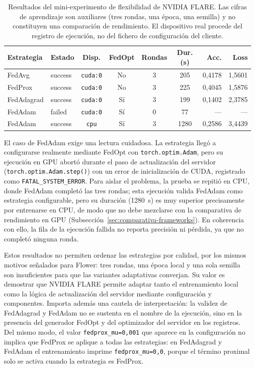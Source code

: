 \begin{table}[htbp]
  \centering
  \caption{Resultados del mini-experimento de flexibilidad de NVIDIA FLARE. Las
  cifras de aprendizaje son auxiliares (tres rondas, una época, una semilla) y no
  constituyen una comparación de rendimiento. El dispositivo real procede del
  registro de ejecución, no del fichero de configuración del cliente.}
  \label{tab:flex-nvflare-resultados}
  \begin{tabular}{llccccrr}
    \toprule
    \textbf{Estrategia} & \textbf{Estado} & \textbf{Disp.} & \textbf{FedOpt} &
    \textbf{Rondas} & \textbf{Dur. (s)} & \textbf{Acc.} & \textbf{Loss} \\
    \midrule
    FedAvg      & success & \texttt{cuda:0} & No  & 3 & 205  & 0,4178 & 1,5601 \\
    FedProx     & success & \texttt{cuda:0} & No  & 3 & 225  & 0,4045 & 1,5876 \\
    FedAdagrad  & success & \texttt{cuda:0} & Sí  & 3 & 199  & 0,1402 & 2,3785 \\
    FedAdam     & failed  & \texttt{cuda:0} & Sí  & 0 & 77   & ---    & ---    \\
    FedAdam     & success & \texttt{cpu}    & Sí  & 3 & 1280 & 0,2586 & 3,4439 \\
    \bottomrule
  \end{tabular}
\end{table}

El caso de FedAdam exige una lectura cuidadosa. La estrategia llegó a configurarse
realmente mediante FedOpt con \texttt{torch.optim.Adam}, pero su ejecución
en GPU abortó durante el paso de actualización del servidor
(\texttt{torch.optim.Adam.step()}) con un error de inicialización de
CUDA, registrado como \texttt{FATAL\_\allowbreak SYSTEM\_\allowbreak ERROR}. Para aislar el problema, la
prueba se repitió en CPU, donde FedAdam completó las tres rondas; esta ejecución
valida FedAdam como estrategia configurable, pero su duración (1280~s) es muy
superior precisamente por entrenarse en CPU, de modo que no debe mezclarse con la
comparativa de rendimiento en GPU (Subsección~\ref{sec:comparativa-frameworks}). En
coherencia con ello, la fila de la ejecución fallida no reporta precisión ni
pérdida, ya que no completó ninguna ronda.

Estos resultados no permiten ordenar las estrategias por calidad, por los mismos
motivos señalados para Flower: tres rondas, una época local y una sola semilla son
insuficientes para que las variantes adaptativas converjan. Su valor es
demostrar que NVIDIA FLARE permite adaptar tanto el entrenamiento local como la
lógica de actualización del servidor mediante configuración y componentes. Importa
además una cautela de interpretación: la validez de FedAdagrad y FedAdam no se
sustenta en el nombre de la ejecución, sino en la presencia del generador FedOpt y
del optimizador del servidor en los registros. Del mismo modo, el valor
\texttt{fedprox\_\allowbreak mu=0,001} que aparece en la configuración no implica que FedProx se
aplique a todas las estrategias: en FedAdagrad y FedAdam el entrenamiento imprime
\texttt{fedprox\_\allowbreak mu=0,0}, porque el término proximal solo se activa cuando la
estrategia es FedProx.

